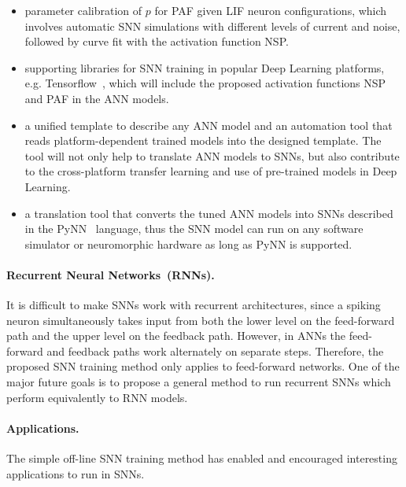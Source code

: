 \begin{itemize}
	\item parameter calibration of $p$ for PAF given LIF neuron configurations, which involves automatic SNN simulations with different levels of current and noise, followed by curve fit with the activation function NSP. 
	
	\item supporting libraries for SNN training in popular Deep Learning platforms, e.g. Tensorflow~\citep{tensorflow2015-whitepaper}, which will include the proposed activation functions NSP and PAF in the ANN models.
	
	\item a unified template to describe any ANN model and an automation tool that reads platform-dependent trained models into the designed template.
	The tool will not only help to translate ANN models to SNNs, but also contribute to the cross-platform transfer learning and use of pre-trained models in Deep Learning.
	
	\item a translation tool that converts the tuned ANN models into SNNs described in the PyNN~\citep{davison2008pynn} language, thus the SNN model can run on any software simulator or neuromorphic hardware as long as PyNN is supported.
\end{itemize}

\paragraph{Recurrent Neural Networks~(RNNs).}
It is difficult to make SNNs work with recurrent architectures, since a spiking neuron simultaneously takes input from both the lower level on the feed-forward path and the upper level on the feedback path.
However, in ANNs the feed-forward and feedback paths work alternately on separate steps.
Therefore, the proposed SNN training method only applies to feed-forward networks.
One of the major future goals is to propose a general method to run recurrent SNNs which perform equivalently to RNN models.

\paragraph{Applications.}
The simple off-line SNN training method has enabled and encouraged interesting applications to run in SNNs.

